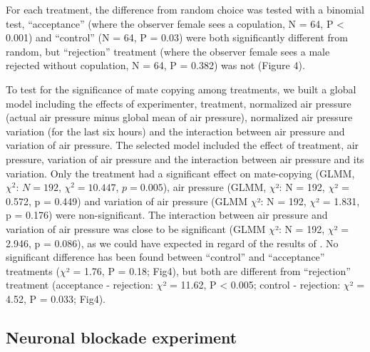 \documentclass[a4paper, 12pt]{article}
\begin{document}
	For each treatment, the difference from random choice was tested with a binomial test, ``acceptance'' (where the observer female sees a copulation, N = 64, P {\textless} 0.001) and ``control'' (N = 64, P = 0.03) were both significantly different from random, but ``rejection'' treatment (where the observer female sees a male rejected without copulation, N = 64, P = 0.382) was not (Figure 4).

	To test for the significance of mate copying among treatments, we built a global model including the effects of experimenter, treatment, normalized air pressure (actual air pressure minus global mean of air pressure), normalized air pressure variation (for the last six hours) and the interaction between air pressure and variation of air pressure. The selected model included the effect of treatment, air pressure, variation of air pressure and the interaction between air pressure and its variation. Only the treatment had a significant effect on mate-copying (GLMM, $\chi^2$: $N = 192$, $\chi^2 = 10.447$, $p = 0.005$), air pressure (GLMM, $\chi $²: N = 192, $\chi $² = 0.572, p = 0.449) and variation of air pressure (GLMM $\chi $²: N = 192, $\chi $² = 1.831, p = 0.176) were non-significant. The interaction between air pressure and variation of air pressure was close to be significant (GLMM $\chi $²: N = 192, $\chi $² = 2.946, p = 0.086), as we could have expected in regard of the results of \textcite{dagaeff_drosophila_2016}. No significant difference has been found between ``control'' and ``acceptance'' treatments ($\chi $² = 1.76, P = 0.18; Fig4), but both are different from ``rejection'' treatment (acceptance - rejection: $\chi $² = 11.62, P {\textless} 0.005; control - rejection: $\chi $² = 4.52, P = 0.033; Fig4).
	
\subsection{Neuronal blockade experiment}
\end{document}
